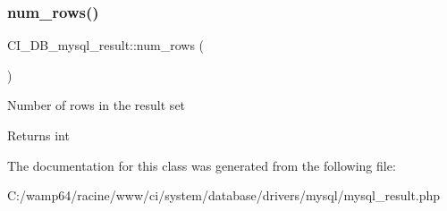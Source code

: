 \subsubsection{\texorpdfstring{num\+\_\+rows()}{num\_rows()}}
{\footnotesize\ttfamily C\+I\+\_\+\+D\+B\+\_\+mysql\+\_\+result\+::num\+\_\+rows (\begin{DoxyParamCaption}{ }\end{DoxyParamCaption})}

Number of rows in the result set

\begin{DoxyReturn}{Returns}
int 
\end{DoxyReturn}


The documentation for this class was generated from the following file\+:\begin{DoxyCompactItemize}
\item 
C\+:/wamp64/racine/www/ci/system/database/drivers/mysql/mysql\+\_\+result.\+php\end{DoxyCompactItemize}
